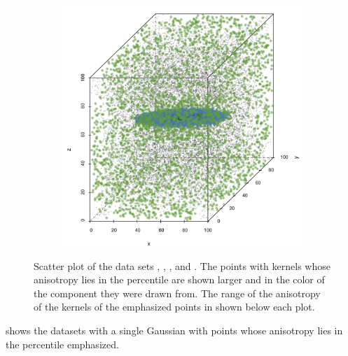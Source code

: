 \begin{figure}
\begin{subfigure}{0.23\textwidth}
					\caption{}
					\label{fig:discussion:anisotropy:baakman4}
				\end{subfigure}		
				\begin{subfigure}{0.23\textwidth}
					\centering
					\includegraphics[keepaspectratio=true, width=\textwidth, height=0.23\textheight]{discussion/img/baakman_5_60000_anisotropy.png}
					\caption{}
					\label{fig:discussion:anisotropy:baakman5}
				\end{subfigure}			
				\caption{Scatter plot of the data sets
					 \ferdosiOne, %
					 \baakmanOne, %
					 \baakmanFour, and %
					 \baakmanFive. %
					The points with kernels whose anisotropy lies in the  percentile are shown larger and in the color of the component they were drawn from. The range of the anisotropy of the kernels of the emphasized points in shown below each plot.}
				\label{fig:discussion:anisotropy:singleSphere}
			\end{figure}
			 shows the datasets with a single Gaussian with points whose anisotropy lies in the  percentile emphasized. 
